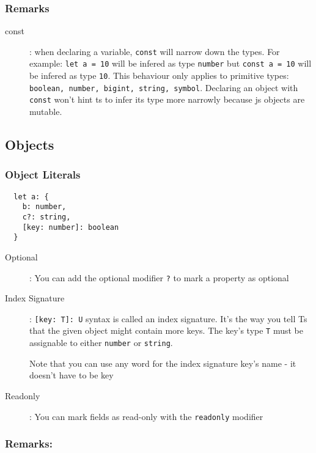 \documentclass[french]{article}
\begin{document}
\subsubsection{Remarks}

\begin{description}
  \item[const]: when declaring a variable, \lstinline{const} will narrow down the types. For example: \lstinline{let a = 10} will be infered as type \lstinline{number} but \lstinline{const a = 10} will be infered as type \lstinline{10}. This behaviour only applies to primitive types: \\ \lstinline{boolean, number, bigint, string, symbol}. Declaring an object with \lstinline{const} won't hint ts to infer its type more narrowly because js objects are mutable.
\end{description}

\subsection{Objects}

\subsubsection{Object Literals}

\begin{lstlisting}
  let a: {
    b: number,
    c?: string,
    [key: number]: boolean
  }
\end{lstlisting}

\begin{description}
  \item[Optional]: You can add the optional modifier \lstinline{?} to mark a property as optional
  \item[Index Signature]: 
    \lstinline{[key: T]: U} syntax is called an index signature. It's the way you tell Ts that the given object might contain more keys. The key's type \lstinline{T} must be assignable to either \lstinline{number} or \lstinline{string}.

    Note that you can use any word for the index signature key's name - it doesn't have to be key
  \item[Readonly]: You can mark fields as read-only with the \lstinline{readonly} modifier
\end{description}


\subsubsection*{Remarks:}
\end{document}
